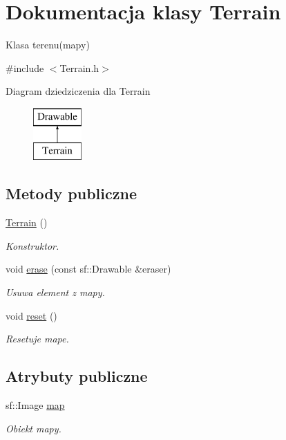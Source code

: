 \hypertarget{class_terrain}{}\section{Dokumentacja klasy Terrain}
\label{class_terrain}


Klasa terenu(mapy)  




{\ttfamily \#include $<$Terrain.\+h$>$}

Diagram dziedziczenia dla Terrain\begin{figure}[H]
\begin{center}
\leavevmode
\includegraphics[height=2.000000cm]{class_terrain}
\end{center}
\end{figure}
\subsection*{Metody publiczne}
\begin{DoxyCompactItemize}
\item 
\mbox{\hyperlink{class_terrain_a7160a06ab07a86ed97d23374405e8ef6}{Terrain}} ()
\begin{DoxyCompactList}\small\item\em Konstruktor. \end{DoxyCompactList}\item 
void \mbox{\hyperlink{class_terrain_a552c55d3ce93ae1c8988432acdf7aea1}{erase}} (const sf\+::\+Drawable \&eraser)
\begin{DoxyCompactList}\small\item\em Usuwa element z mapy. \end{DoxyCompactList}\item 
void \mbox{\hyperlink{class_terrain_a009d97df85f0704ad9ea3c61fcd11080}{reset}} ()
\begin{DoxyCompactList}\small\item\em Resetuje mape. \end{DoxyCompactList}\end{DoxyCompactItemize}
\subsection*{Atrybuty publiczne}
\begin{DoxyCompactItemize}
\item 
sf\+::\+Image \mbox{\hyperlink{class_terrain_afda7533fb267038f082301a417691483}{map}}
\begin{DoxyCompactList}\small\item\em Obiekt mapy. \end{DoxyCompactList}\end{DoxyCompactItemize}
